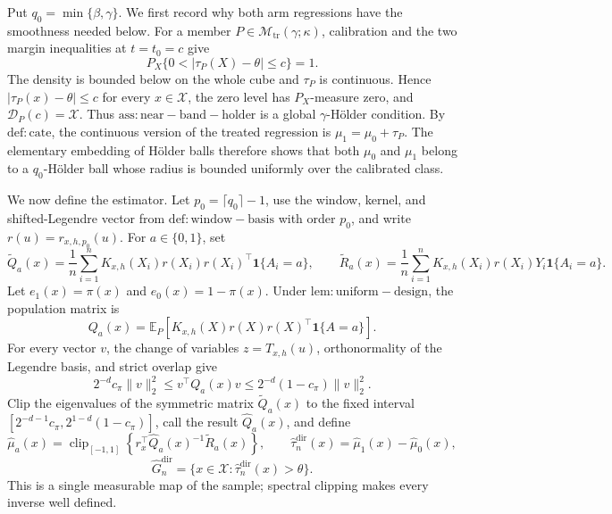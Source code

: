 Put \(q_0=\min\{\beta,\gamma\}\). We first record why both arm regressions have the smoothness needed below. For a member \(P\in\mathcal M_{\mathrm{tr}}(\gamma;\kappa)\), calibration and the two margin inequalities at \(t=t_0=c\) give
\[
 P_X\{0<|\tau_P(X)-\theta|\le c\}=1.
\]
The density is bounded below on the whole cube and \(\tau_P\) is continuous. Hence \(|\tau_P(x)-\theta|\le c\) for every \(x\in\mathcal X\), the zero level has \(P_X\)-measure zero, and \(\mathcal D_P(c)=\mathcal X\). Thus \(\mathrm{ass:near-band-holder}\) is a global \(\gamma\)-Hölder condition. By \(\mathrm{def:cate}\), the continuous version of the treated regression is \(\mu_1=\mu_0+\tau_P\). The elementary embedding of Hölder balls therefore shows that both \(\mu_0\) and \(\mu_1\) belong to a \(q_0\)-Hölder ball whose radius is bounded uniformly over the calibrated class.

We now define the estimator. Let \(p_0=\lceil q_0\rceil-1\), use the window, kernel, and shifted-Legendre vector from \(\mathrm{def:window-basis}\) with order \(p_0\), and write \(r(u)=r_{x,h,p_0}(u)\). For \(a\in\{0,1\}\), set
\[
 \widetilde Q_a(x)=\frac1n\sum_{i=1}^n K_{x,h}(X_i)r(X_i)r(X_i)^\top\mathbf 1\{A_i=a\},
 \qquad
 \widetilde R_a(x)=\frac1n\sum_{i=1}^n K_{x,h}(X_i)r(X_i)Y_i\mathbf 1\{A_i=a\}.
\]
Let \(e_1(x)=\pi(x)\) and \(e_0(x)=1-\pi(x)\). Under \(\mathrm{lem:uniform-design}\), the population matrix is
\[
 Q_a(x)=\mathbb E_P\!\left[K_{x,h}(X)r(X)r(X)^\top\mathbf 1\{A=a\}\right].
\]
For every vector \(v\), the change of variables \(z=T_{x,h}(u)\), orthonormality of the Legendre basis, and strict overlap give
\[
 2^{-d}c_\pi\|v\|_2^2
 \le v^\top Q_a(x)v
 \le 2^{-d}(1-c_\pi)\|v\|_2^2.
\]
Clip the eigenvalues of the symmetric matrix \(\widetilde Q_a(x)\) to the fixed interval \([2^{-d-1}c_\pi,2^{1-d}(1-c_\pi)]\), call the result \(\widehat Q_a(x)\), and define
\[
 \widehat\mu_a(x)=\operatorname{clip}_{[-1,1]}
 \left\{r_x^\top\widehat Q_a(x)^{-1}\widetilde R_a(x)\right\},
 \qquad
 \widehat\tau^{\mathrm{dir}}_n(x)=\widehat\mu_1(x)-\widehat\mu_0(x),
\]
\[
 \widehat G_n^{\mathrm{dir}}=\{x\in\mathcal X:\widehat\tau^{\mathrm{dir}}_n(x)>\theta\}.
\]
This is a single measurable map of the sample; spectral clipping makes every inverse well defined.

